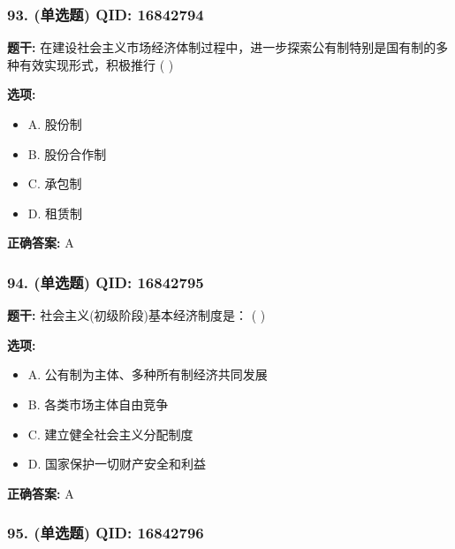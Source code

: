 \documentclass[12pt,UTF8]{ctexart}
\begin{document}
\subsubsection*{93. (单选题) \small QID: 16842794}

\textbf{题干:}
在建设社会主义市场经济体制过程中，进一步探索公有制特别是国有制的多种有效实现形式，积极推行 ( )

\textbf{选项:}
\begin{itemize}[leftmargin=*]

  \item A. 股份制

  \item B. 股份合作制

  \item C. 承包制

  \item D. 租赁制

\end{itemize}

\textbf{正确答案:}
A

\vspace{0.3em}\hrulefill\vspace{0.7em}

\subsubsection*{94. (单选题) \small QID: 16842795}

\textbf{题干:}
社会主义(初级阶段)基本经济制度是： ( )

\textbf{选项:}
\begin{itemize}[leftmargin=*]

  \item A. 公有制为主体、多种所有制经济共同发展

  \item B. 各类市场主体自由竞争

  \item C. 建立健全社会主义分配制度

  \item D. 国家保护一切财产安全和利益

\end{itemize}

\textbf{正确答案:}
A

\vspace{0.3em}\hrulefill\vspace{0.7em}

\subsubsection*{95. (单选题) \small QID: 16842796}
\end{document}
